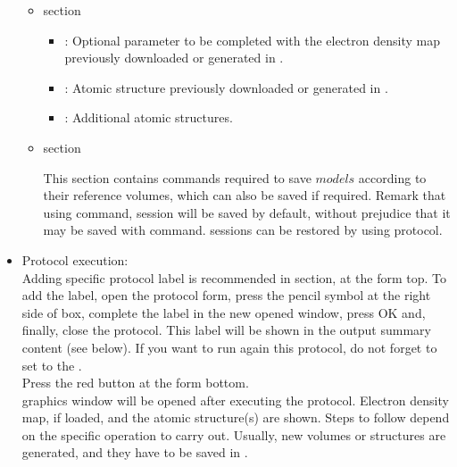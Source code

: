 \begin{itemize}
    \begin{itemize}
     \item {} section

    \begin{itemize}
     \item {}: Optional parameter to be completed with the electron density map previously downloaded or generated in \scipion.
     \item {}: Atomic structure previously downloaded or generated in \scipion.
     \item {}: Additional atomic structures.
    \end{itemize}
    \item {} section
    
    This section contains \chimera commands required to save $models$ according to their reference volumes, which can also be saved if required. Remark that using  command, \chimera session will be saved by default, without prejudice that it may be saved with  command. \chimera sessions can be restored by using  protocol.
    
    \end{itemize}

  \item Protocol execution:\\
  
  Adding specific protocol label is recommended in  section, at the form top. To add the label, open the protocol form, press the pencil symbol at the right side of  box, complete the label in the new opened window, press OK and, finally, close the protocol. This label will be shown in the output summary content (see below). If you want to run again this protocol, do not forget to set to  the .\\
  Press the  red button at the form bottom.\\
  
  \chimera graphics window will be opened after executing the protocol. Electron density map, if loaded, and the atomic structure(s) are shown. Steps to follow depend on the specific operation to carry out. Usually, new volumes or structures are generated, and they have to be saved in \scipion.
  \begin{itemize}
   

\end{itemize}
\end{itemize}
